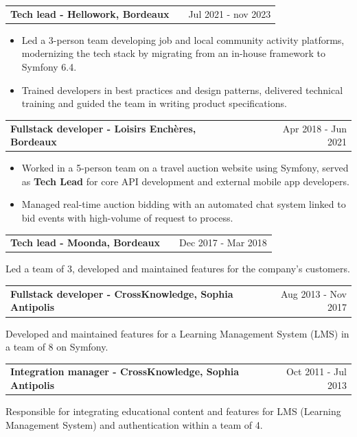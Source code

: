 \documentclass[a4paper,10pt]{article}
\makeatletter
\newenvironment{jobshort}[2]
{
    \begin{tabularx}{\linewidth}{@{}l X r@{}}
    \textbf{#1} & \hfill &  #2 \\[3.75pt]
    \end{tabularx}
    \begin{minipage}[t]{\linewidth}
    \begin{itemize}[nosep,leftmargin=1em,label=--]
}
{
    \end{itemize}
    \end{minipage}
}
\makeatother
\begin{document}
    \begin{jobshort}{Tech lead - Hellowork, Bordeaux}{Jul 2021 - nov 2023}
        \begin{itemize}
            \item Led a 3-person team developing job and local community activity platforms, modernizing the tech stack by migrating from an in-house framework to Symfony 6.4.
            \item Trained developers in best practices and design patterns, delivered technical training and guided the team in writing product specifications.
        \end{itemize}
    \end{jobshort}

    \begin{jobshort}{Fullstack developer - Loisirs Enchères, Bordeaux}{Apr 2018 - Jun 2021}
        \begin{itemize}
            \item Worked in a 5-person team on a travel auction website using Symfony, served as \textbf{Tech Lead} for core API development and external mobile app developers.
            \item Managed real-time auction bidding with an automated chat system linked to bid events with high-volume of request to process.
        \end{itemize}
    \end{jobshort}

    \begin{jobshort}{Tech lead - Moonda, Bordeaux}{Dec 2017 - Mar 2018}
        Led a team of 3, developed and maintained features for the company's customers.
    \end{jobshort}

    \begin{jobshort}{Fullstack developer - CrossKnowledge, Sophia Antipolis}{Aug 2013 - Nov 2017}
        Developed and maintained features for a Learning Management System (LMS) in a team of 8 on Symfony.
    \end{jobshort}

    \begin{jobshort}{Integration manager - CrossKnowledge, Sophia Antipolis}{Oct 2011 - Jul 2013}
        Responsible for integrating educational content and features for LMS (Learning Management System) and authentication within a team of 4.
    \end{jobshort}
\end{document}
